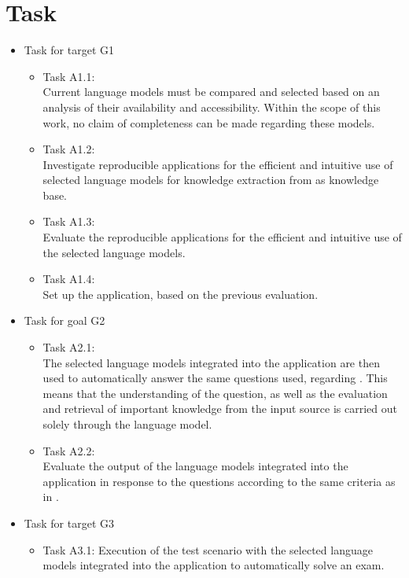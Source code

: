 \section{Task}
\begin{itemize}
  \item Task for target G1
        \begin{itemize}
          \item Task A1.1:\\
          Current language models must be compared and selected based on an analysis of their availability and accessibility.
          Within the scope of this work, no claim of completeness can be made regarding these models.
          \item Task A1.2:\\Investigate reproducible applications for the efficient and intuitive use of selected language models for knowledge extraction from \citet{bb2} as knowledge base.
          \item Task A1.3:\\Evaluate the reproducible applications for the efficient and intuitive use of the selected language models.
          \item Task A1.4:\\Set up the application, based on the previous evaluation.
        \end{itemize}
  \item Task for goal G2
        \begin{itemize}
        \item Task A2.1:\\
        The selected language models integrated into the application are then used to automatically answer the same questions \citet{Paul_Keller} used, regarding \citet{bb2}.
        This means that the understanding of the question, as well as the evaluation and retrieval of important knowledge from the input source \citet{bb2} is carried out solely through the language model.
        \item Task A2.2:\\
        Evaluate the output of the language models integrated into the application in response to the questions according to the same criteria as in \citet{Paul_Keller}.
        \end{itemize}
 \item Task for target G3
    \begin{itemize}
          \item Task A3.1: Execution of the test scenario with the selected language models integrated into the application to automatically solve an exam.

\end{itemize}
\end{itemize}
